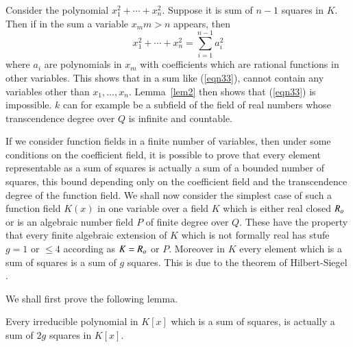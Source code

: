 Consider the polynomial $x^{2}_1+\cdots+x^{2}_n$. Suppose it is sum of
$n-1$ squares in $K$. Then if in the sum a variable $x_m m>n$ appears,
then 
\begin{equation}\label{eqn33}
x^{2}_1+\cdots+x^{2}_n=\sum\limits_{i=1}^{n-1}a^{2}_i
\end{equation}
where $a_i$ are polynomials in $x_m$ with coefficients which are
rational functions in other variables. This shows that in a sum like
(\ref{eqn33}), cannot contain any variables other than
$x_1,\ldots,x_n$. Lemma~\ref{lem2} then shows that (\ref{eqn33}) is
impossible. $k$ can for example be a subfield of the field of real
numbers whose transcendence degree over $Q$ is infinite and countable.

If we consider function fields in a finite number of variables, then
under some conditions on the coefficient field, it is possible to
prove that every element representable as a sum of squares is actually
a sum of a bounded number of squares, this bound depending only on the
coefficient field and the transcendence degree of the function
field. We shall now consider the simplest case of such a function
field $K(x)$ in one variable over a field $K$ which is either real
closed $R_{o}$ or is an algebraic number field $P$ of finite degree
over $Q$. These have the property that every finite algebraic
extension of $K$ which is not formally real has stufe $g=1$ or $\leq
4$ according as $K=R_{o}$ or $P$. Moreover in $K$ every element
which is a sum of squares is a sum of $g$ squares. This is due to the
theorem of Hilbert-Siegel \cite{key16}.

We shall first prove the following lemma.

\begin{lem}\label{lem3}
Every irreducible polynomial in $K[x]$ which is a sum of squares, is
actually a sum of $2g$ squares in $K[x]$.
\end{lem}


